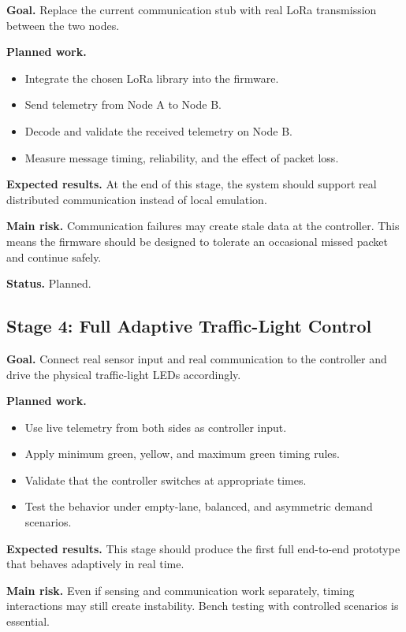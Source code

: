 \documentclass[11pt,a4paper]{article}
\begin{document}
\textbf{Goal.} Replace the current communication stub with real LoRa transmission between the two nodes.

\textbf{Planned work.}

\begin{itemize}
    \item Integrate the chosen LoRa library into the firmware.
    \item Send telemetry from Node A to Node B.
    \item Decode and validate the received telemetry on Node B.
    \item Measure message timing, reliability, and the effect of packet loss.
\end{itemize}

\textbf{Expected results.} At the end of this stage, the system should support real distributed communication instead of local emulation.

\textbf{Main risk.} Communication failures may create stale data at the controller. This means the firmware should be designed to tolerate an occasional missed packet and continue safely.

\textbf{Status.} Planned.

\subsection{Stage 4: Full Adaptive Traffic-Light Control}

\textbf{Goal.} Connect real sensor input and real communication to the controller and drive the physical traffic-light LEDs accordingly.

\textbf{Planned work.}

\begin{itemize}
    \item Use live telemetry from both sides as controller input.
    \item Apply minimum green, yellow, and maximum green timing rules.
    \item Validate that the controller switches at appropriate times.
    \item Test the behavior under empty-lane, balanced, and asymmetric demand scenarios.
\end{itemize}

\textbf{Expected results.} This stage should produce the first full end-to-end prototype that behaves adaptively in real time.

\textbf{Main risk.} Even if sensing and communication work separately, timing interactions may still create instability. Bench testing with controlled scenarios is essential.
\end{document}
